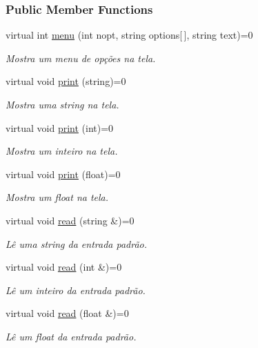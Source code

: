 \subsubsection*{Public Member Functions}
\begin{DoxyCompactItemize}
\item 
virtual int \hyperlink{classWindow_a3b6d7449c7f088f9ce59002573ca82c0}{menu} (int nopt, string options\mbox{[}$\,$\mbox{]}, string text)=0
\begin{DoxyCompactList}\small\item\em Mostra um menu de opções na tela. \end{DoxyCompactList}\item 
virtual void \hyperlink{classWindow_a4fd86bca046073b3429f221c2f3bb690}{print} (string)=0
\begin{DoxyCompactList}\small\item\em Mostra uma string na tela. \end{DoxyCompactList}\item 
virtual void \hyperlink{classWindow_aa0a1210e72a63332e49722f1f878ea94}{print} (int)=0
\begin{DoxyCompactList}\small\item\em Mostra um inteiro na tela. \end{DoxyCompactList}\item 
virtual void \hyperlink{classWindow_a08f0e967158988de3cf9eb08a7823585}{print} (float)=0
\begin{DoxyCompactList}\small\item\em Mostra um float na tela. \end{DoxyCompactList}\item 
virtual void \hyperlink{classWindow_abb59602c637907250fd70b1450b85c5c}{read} (string \&)=0
\begin{DoxyCompactList}\small\item\em Lê uma string da entrada padrão. \end{DoxyCompactList}\item 
virtual void \hyperlink{classWindow_ab00a4c057aade6ddc2a4bb22b2a6de42}{read} (int \&)=0
\begin{DoxyCompactList}\small\item\em Lê um inteiro da entrada padrão. \end{DoxyCompactList}\item 
virtual void \hyperlink{classWindow_a2a1c43d55946185d0cee7324c78758fc}{read} (float \&)=0
\begin{DoxyCompactList}\small\item\em Lê um float da entrada padrão. \end{DoxyCompactList}\item 

\end{DoxyCompactItemize}
